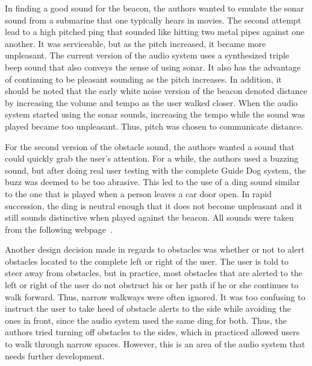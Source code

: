 In finding a good sound for the beacon, the authors wanted to emulate the sonar
sound from a submarine that one typically hears in movies. The second attempt
lead to a high pitched ping that sounded like hitting two metal pipes against
one another. It was serviceable, but as the pitch increased, it became more
unpleasant. The current version of the audio system uses a synthesized triple
beep sound that also conveys the sense of using sonar. It also has the
advantage of continuing to be pleasant sounding as the pitch increases. In
addition, it should be noted that the early white noise version of the beacon
denoted distance by increasing the volume and tempo as the user walked closer.
When the audio system started using the sonar sounds, increasing the tempo
while the sound was played became too unpleasant. Thus, pitch was chosen to
communicate distance.

For the second version of the obstacle sound, the authors wanted a sound that
could quickly grab the user's attention. For a while, the authors used a buzzing
sound, but after doing real user testing with the complete Guide Dog system,
the buzz was deemed to be too abrasive. This led to the use of a ding sound
similar to the one that is played when a person leaves a car door open. In
rapid succession, the ding is neutral enough that it does not become unpleasant
and it still sounds distinctive when played against the beacon. All sounds were
taken from the following webpage~\cite{freesound-website}.

Another design decision made in regards to obstacles was whether or not to alert
obstacles located to the complete left or right of the user. The user is told to
steer away from obstacles, but in practice, most obstacles that are alerted to the
left or right of the user do not obstruct his or her path if he or she continues
to walk forward. Thus, narrow walkways were often ignored. It was too confusing
to instruct the user to take heed of obstacle alerts to the side while avoiding
the ones in front, since the audio system used the same ding for both. Thus, the
authors tried turning off obstacles to the sides, which in practiced allowed
users to walk through narrow spaces. However, this is an area of the audio
system that needs further development.
